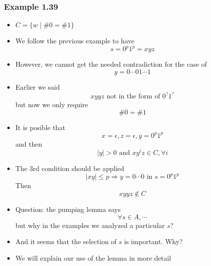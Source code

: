 \begin{frame}[allowframebreaks] \frametitle{Example 1.39}
  \begin{itemize}
\item $C=\{w \mid \#0 = \#1\}$
\item We follow the previous example to have
  \begin{equation*}
  s=0^p 1^p=xyz
\end{equation*}
\item However, we cannot get the needed contradiction for the case
  of
  \begin{equation*}
    y = 0 \cdots 0 1 \cdots 1
  \end{equation*}
\item Earlier we said
  \begin{equation*}
    xyyz \text{ not in the form of } 0^? 1^?
  \end{equation*}
but now we only require
\begin{equation*}
  \# 0 = \# 1
\end{equation*}
\item It is posible that 
  \begin{equation*}
x=\epsilon, z=\epsilon, y = 0^p 1^p 
\end{equation*}
and then
\begin{equation*}
|y| > 0 \text{ and } xy^i z\in C, \forall i
\end{equation*}

\item The 3rd condition should be applied
  \begin{equation*}
|xy| \leq p \Rightarrow y = 0 \cdots 0 \text{ in } s = 0^p 1^p
\end{equation*}
Then 
\begin{equation*}
xyyz \notin C
\end{equation*}
\item Question: the pumping lemma says
  \begin{equation*}
    \forall s \in A, \cdots
  \end{equation*}
  but why in the examples we analyzed a \alert{particular $s$}?
\item And it seems that the selection of $s$ is important. Why?

\item We will explain our use of the lemma in more detail
\end{itemize}\end{frame}



